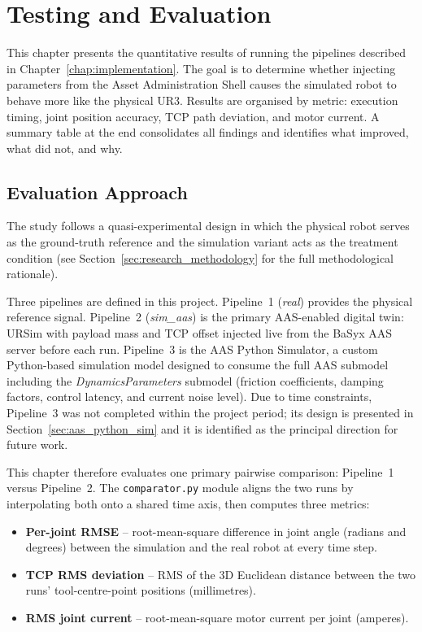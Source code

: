\chapter{Testing and Evaluation}
\label{chap:testing}

This chapter presents the quantitative results of running the pipelines described in
Chapter~\ref{chap:implementation}.
The goal is to determine whether injecting parameters from the Asset Administration Shell causes
the simulated robot to behave more like the physical UR3.
Results are organised by metric: execution timing, joint position accuracy, TCP path deviation,
and motor current.
A summary table at the end consolidates all findings and identifies what improved, what did not,
and why.


\section{Evaluation Approach}
\label{sec:eval_methodology}

The study follows a quasi-experimental design \cite{cook1979quasi, wieringa2014design} in
which the physical robot serves as the ground-truth reference and the simulation variant
acts as the treatment condition (see Section~\ref{sec:research_methodology} for the full
methodological rationale).

Three pipelines are defined in this project.
Pipeline~1 (\textit{real}) provides the physical reference signal.
Pipeline~2 (\textit{sim\_aas}) is the primary AAS-enabled digital twin: URSim with payload
mass and TCP offset injected live from the BaSyx AAS server before each run.
Pipeline~3 is the AAS Python Simulator, a custom Python-based simulation model designed to
consume the full AAS submodel including the \textit{DynamicsParameters} submodel
(friction coefficients, damping factors, control latency, and current noise level).
Due to time constraints, Pipeline~3 was not completed within the project period; its design
is presented in Section~\ref{sec:aas_python_sim} and it is identified as the principal
direction for future work.

This chapter therefore evaluates one primary pairwise comparison: Pipeline~1 versus
Pipeline~2.
The \texttt{comparator.py} module aligns the two runs by interpolating both onto a shared
time axis, then computes three metrics:

\begin{itemize}
    \item \textbf{Per-joint RMSE} -- root-mean-square difference in joint angle (radians and
          degrees) between the simulation and the real robot at every time step.
    \item \textbf{TCP RMS deviation} -- RMS of the 3D Euclidean distance between the two runs'
          tool-centre-point positions (millimetres).
    \item \textbf{RMS joint current} -- root-mean-square motor current per joint (amperes).
\end{itemize}

